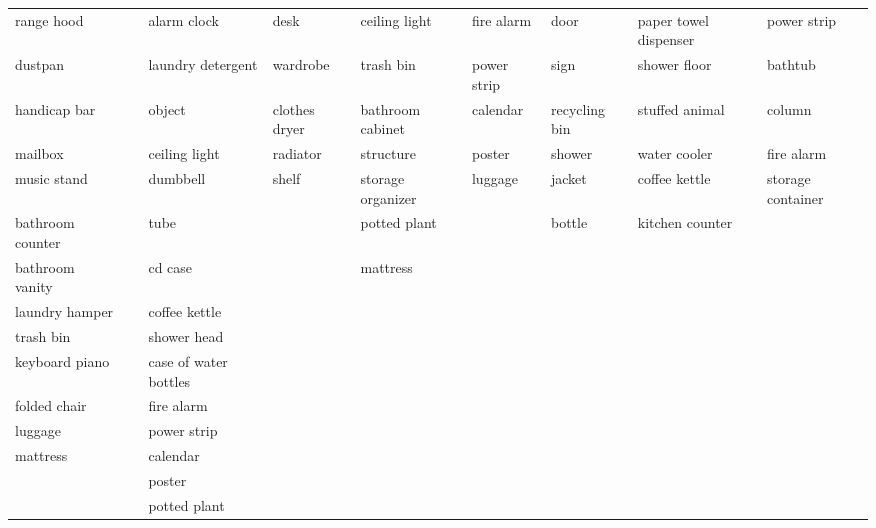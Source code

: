 \begin{table*}[!ht]
{\begin{tabular}{lll|lll|lll}
        range hood & ~ & alarm clock & desk & ceiling light & fire alarm & door & paper towel dispenser & power strip \\ 
        dustpan & ~ & laundry detergent & wardrobe & trash bin & power strip & sign & shower floor & bathtub \\ 
        handicap bar & ~ & object & clothes dryer & bathroom cabinet & calendar & recycling bin & stuffed animal & column \\ 
        mailbox & ~ & ceiling light & radiator & structure & poster & shower & water cooler & fire alarm \\ 
        music stand & ~ & dumbbell & shelf & storage organizer & luggage & jacket & coffee kettle & storage container \\ 
        bathroom counter & ~ & tube & ~ & potted plant & ~ & bottle & kitchen counter & ~ \\ 
        bathroom vanity & ~ & cd case & ~ & mattress & ~ & ~ & ~ & ~ \\ 
        laundry hamper & ~ & coffee kettle & ~ & ~ & ~ & ~ & ~ & ~ \\ 
        trash bin & ~ & shower head & ~ & ~ & ~ & ~ & ~ & ~ \\ 
        keyboard piano & ~ & case of water bottles & ~ & ~ & ~ & ~ & ~ & ~ \\ 
        folded chair & ~ & fire alarm & ~ & ~ & ~ & ~ & ~ & ~ \\ 
        luggage & ~ & power strip & ~ & ~ & ~ & ~ & ~ & ~ \\ 
        mattress & ~ & calendar & ~ & ~ & ~ & ~ & ~ & ~ \\ 
        ~ & ~ & poster & ~ & ~ & ~ & ~ & ~ & ~ \\ 
        ~ & ~ & potted plant & ~ & ~ & ~ & ~ & ~ & ~ \\ 
    \bottomrule
    \end{tabular}
    }
    \label{tab:split_fullview}
\end{table*}
